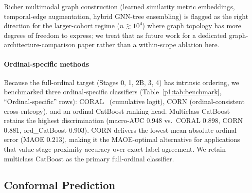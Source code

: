 \documentclass[10pt,letterpaper]{article}
\begin{document}
Richer multimodal graph construction (learned similarity metric embeddings, temporal-edge augmentation, hybrid GNN-tree ensembling) is flagged as the right direction for the larger-cohort regime ($n \gtrsim 10^4$) where graph topology has more degrees of freedom to express; we treat that as future work for a dedicated graph-architecture-comparison paper rather than a within-scope ablation here.

\paragraph*{Ordinal-specific methods} Because the full-ordinal target (Stages 0, 1, 2B, 3, 4) has intrinsic ordering, we benchmarked three ordinal-specific classifiers (Table~\ref{p1:tab:benchmark}, ``Ordinal-specific'' rows): CORAL~\cite{bonnier2022ordinal} (cumulative logit), CORN (ordinal-consistent cross-entropy), and an ordinal CatBoost ranking head. Multiclass CatBoost retains the highest discrimination (macro-AUC 0.948 vs.\ CORAL 0.898, CORN 0.881, ord\_CatBoost 0.903). CORN delivers the lowest mean absolute ordinal error (MAOE 0.213), making it the MAOE-optimal alternative for applications that value stage-proximity accuracy over exact-label agreement. We retain multiclass CatBoost as the primary full-ordinal classifier.

\subsection*{Conformal Prediction}
\end{document}
